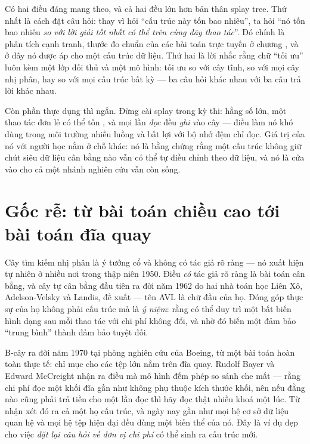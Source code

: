 \documentclass[../../algorithm.tex]{subfiles}
\begin{document}
Có hai điều đáng mang theo, và cả hai đều lớn hơn bản thân splay tree. Thứ nhất là cách đặt câu hỏi: thay vì hỏi ``cấu trúc này tốn bao nhiêu'', ta hỏi ``nó tốn bao nhiêu \emph{so với lời giải tốt nhất có thể trên cùng dãy thao tác}''. Đó chính là phân tích cạnh tranh, thước đo chuẩn của các bài toán trực tuyến ở chương , và ở đây nó được áp cho một cấu trúc dữ liệu. Thứ hai là lời nhắc rằng chữ ``tối ưu'' luôn kèm một lớp đối thủ và một mô hình: tối ưu so với cây tĩnh, so với mọi cây nhị phân, hay so với mọi cấu trúc bất kỳ --- ba câu hỏi khác nhau với ba câu trả lời khác nhau.

Còn phần thực dụng thì ngắn. Đừng cài splay trong kỳ thi: hằng số lớn, một thao tác đơn lẻ có thể tốn , và mọi lần \emph{đọc} đều \emph{ghi} vào cây --- điều làm nó khó dùng trong môi trường nhiều luồng và bất lợi với bộ nhớ đệm chỉ đọc. Giá trị của nó với người học nằm ở chỗ khác: nó là bằng chứng rằng một cấu trúc không giữ chút siêu dữ liệu cân bằng nào vẫn có thể tự điều chỉnh theo dữ liệu, và nó là cửa vào cho cả một nhánh nghiên cứu vẫn còn sống.

\section{Gốc rễ: từ bài toán chiều cao tới bài toán đĩa quay}

Cây tìm kiếm nhị phân là ý tưởng cổ và không có tác giả rõ ràng --- nó xuất hiện tự nhiên ở nhiều nơi trong thập niên 1950. Điều \emph{có} tác giả rõ ràng là bài toán cân bằng, và cây tự cân bằng đầu tiên ra đời năm 1962 do hai nhà toán học Liên Xô, Adelson-Velsky và Landis, đề xuất --- tên AVL là chữ đầu của họ. Đóng góp thực sự của họ không phải cấu trúc mà là \emph{ý niệm}: rằng có thể duy trì một bất biến hình dạng sau mỗi thao tác với chi phí không đổi, và nhờ đó biến một đảm bảo ``trung bình'' thành đảm bảo tuyệt đối.

B-cây ra đời năm 1970 tại phòng nghiên cứu của Boeing, từ một bài toán hoàn toàn thực tế: chỉ mục cho các tệp lớn nằm trên đĩa quay. Rudolf Bayer và Edward McCreight nhận ra điều mà mô hình đếm phép so sánh che mất --- rằng chi phí đọc một khối đĩa gần như không phụ thuộc kích thước khối, nên nếu đằng nào cũng phải trả tiền cho một lần đọc thì hãy đọc thật nhiều khoá một lúc. Từ nhận xét đó ra cả một họ cấu trúc, và ngày nay gần như mọi hệ cơ sở dữ liệu quan hệ và mọi hệ tệp hiện đại đều dùng một biến thể của nó. Đây là ví dụ đẹp cho việc \emph{đặt lại câu hỏi về đơn vị chi phí} có thể sinh ra cấu trúc mới.
\end{document}
